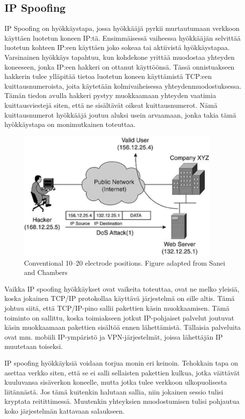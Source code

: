 \subsection{IP Spoofing}

IP Spoofing on hyökkäystapa, jossa hyökkääjä pyrkii murtautumaan verkkoon
käyttäen luotetun koneen IP:tä. Ensimmäisessä vaiheessa hyökkääjän selvittää
luotetun kohteen IP:een käyttäen joko sokeaa tai aktiivistä hyökkäystapaa.
Varsinainen hyökkäys tapahtuu, kun kohdekone yrittää muodostaa yhteyden
koneeseen, jonka IP:een hakkeri on ottanut käyttöönsä. Tässä onnistuakseen
hakkerin tulee ylläpitää tietoa luotetun koneen käyttämistä TCP:een
kuittausnumeroista, joita käytetään kolmivaiheisessa yhteydenmuodostuksessa.
Tämän tiedon avulla hakkeri pystyy muokkaamaan yhteyden vaatimia
kuittausviestejä siten, että ne sisältävät oikeat kuittausnumerot. Nämä
kuittausnumerot hyökkääjä joutuu aluksi usein arvaamaan, jonka takia tämä
hyökkäystapa on monimutkainen toteuttaa\cite{websecurity}.

\begin{figure}[ht]
\centering
\includegraphics[width=10cm]{pics/spoofing.pdf}
\caption[Conventional electrode positioning]{Conventional 10--20 electrode positions. Figure adapted from Sanei and Chambers}
\label{ELECTRODE_POSITIONS}
\end{figure}

Vaikka IP spoofing hyökkäykset ovat vaikeita toteuttaa, ovat ne melko yleisiä,
koska jokainen TCP/IP protokollaa käyttävä järjestelmä on sille altis. Tämä
johtuu siitä, että TCP/IP-pino sallii pakettien käsin muokkaamisen. Tämä
toiminto on sallittu, koska toimiakseen jotkut IP-pohjaiset palvelut joutuvat
käsin muokkaamaan pakettien sisältöä ennen lähettämistä. Tällaisia palveluita
ovat mm. mobiili IP-ympäristö ja VPN-järjestelmät, joissa lähettäjän IP
muutetaan toiseksi\cite{joku}.

IP spoofing hyökkäyksiä voidaan torjua monin eri keinoin. Tehokkain tapa on
asettaa verkko siten, että se ei salli sellaisten pakettien kulkua, jotka
väittävät kuuluvansa sisäverkon koneelle, mutta jotka tulee verkkoon
ulkopuolisesta liitännästä. Jos tämä kuitenkin halutaan sallia, niin jokainen
sessio tulisi kryptata reitittimessä. Muutenkin yhteyksien muodostumisen tulisi
pohjautua koko järjestelmän kattavaan salaukseen\cite{websecurity}.

